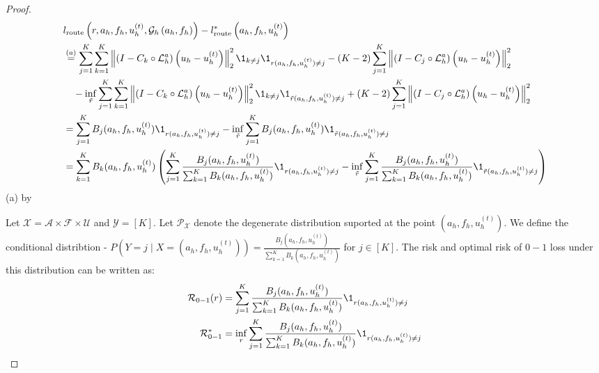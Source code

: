 \documentclass{article} %
\begin{document}
\begin{proof}
\begin{align*}
    &l_{\text{route}}\left(r, a_h, f_h, u^{(t)}_h, \mathcal{G}_h\left(a_h, f_h\right)\right) - l_{\text{route}}^*\left(a_h, f_h, u^{(t)}_h\right) \\
    &\overset{(a)}{=} \sum_{j = 1}^K\sum_{k = 1}^K\left\|\left( I - C_{k} \circ \mathcal{L}_{h}^a\right)\left(u_h - u^{(t)}_h\right)\right\|^2_2\1_{k\neq j}\1_{r(a_h, f_h, u^{(t)}_h) \neq j}  -\left(K - 2\right)\sum_{j = 1}^K\left\|\left( I - C_{j} \circ \mathcal{L}_{h}^a\right)\left(u_h - u^{(t)}_h\right)\right\|^2_2 \\
    &\quad- \inf_{\Tilde{r}} \sum_{j = 1}^K\sum_{k = 1}^K\left\|\left( I - C_{k} \circ \mathcal{L}_{h}^a\right)\left(u_h - u^{(t)}_h\right)\right\|^2_2\1_{k\neq j}\1_{\tilde{r}(a_h, f_h, u^{(t)}_h) \neq j}  +\left(K - 2\right)\sum_{j = 1}^K\left\|\left( I - C_{j} \circ \mathcal{L}_{h}^a\right)\left(u_h - u^{(t)}_h\right)\right\|^2_2 \\
    &= \sum_{j = 1}^K B_j(a_h, f_h, u^{(t)}_h)\1_{r(a_h, f_h, u^{(t)}_h) \neq j} - \inf_{\Tilde{r}} \sum_{j = 1}^KB_j(a_h, f_h, u^{(t)}_h)\1_{\tilde{r}(a_h, f_h, u^{(t)}_h) \neq j}  \\
    &= \sum_{k = 1}^K B_k(a_h, f_h, u^{(t)}_h)\left(\sum_{j = 1}^K \frac{B_j(a_h, f_h, u^{(t)}_h)}{\sum_{k = 1}^K B_k(a_h, f_h, u^{(t)}_h)}\1_{r(a_h, f_h, u^{(t)}_h) \neq j} - \inf_{\Tilde{r}} \sum_{j = 1}^K \frac{B_j(a_h, f_h, u^{(t)}_h)}{ \sum_{k = 1}^K B_k(a_h, f_h, u^{(t)}_h)}\1_{\tilde{r}(a_h, f_h, u^{(t)}_h) \neq j}\right)
\end{align*}
(a) by 

Let $\mathcal{X} = \mathcal{A} \times \mathcal{F} \times \mathcal{U}$ and $\mathcal{Y} = [K]$. Let $\mathcal{P}_{\mathcal{X}}$ denote the degenerate distribution suported at the point $(a_h, f_h, u_h^{(t)})$. We define the conditional distribtion - $P(Y = j \mid X = (a_h, f_h, u_h^{(t)})) = \frac{B_j(a_h, f_h, u^{(t)}_h)}{ \sum_{k = 1}^K B_k(a_h, f_h, u^{(t)}_h)}$ for $j \in [K]$. The risk and optimal risk of $0-1$ loss under this distribution can be written as:
\begin{align*}
    \mathcal{R}_{0-1}(r) &= \sum_{j = 1}^K \frac{B_j(a_h, f_h, u^{(t)}_h)}{\sum_{k = 1}^K B_k(a_h, f_h, u^{(t)}_h)}\1_{r(a_h, f_h, u^{(t)}_h) \neq j} \\
    \mathcal{R}_{0-1}^* &= \inf_r \sum_{j = 1}^K \frac{B_j(a_h, f_h, u^{(t)}_h)}{\sum_{k = 1}^K B_k(a_h, f_h, u^{(t)}_h)}\1_{r(a_h, f_h, u^{(t)}_h) \neq j} 
\end{align*}


\end{proof}
\end{document}
